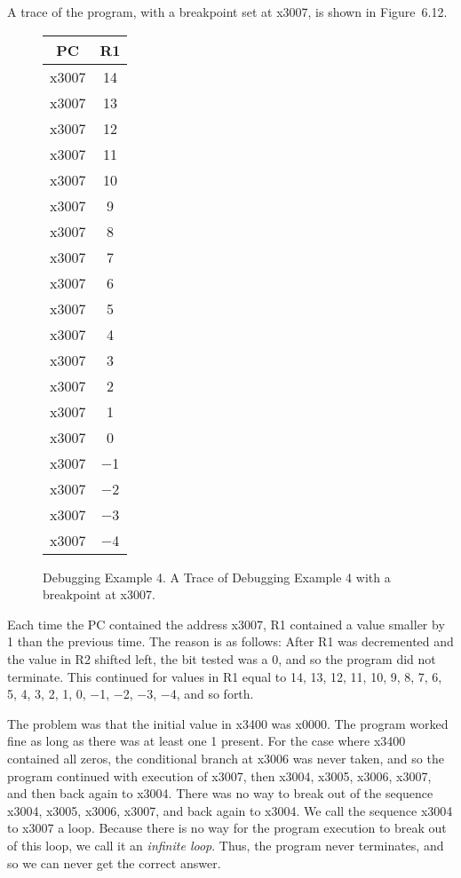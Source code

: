 \documentclass{patt}
\begin{document}
A trace of the program, with a breakpoint set at x3007, is shown in 
Figure~6.12.

\FloatBarrier
\setcounter{figure}{11}
\begin{figure}[b]
\noindent\small
\hspace*{-8pc}\begin{minipage}{36pc}
\begin{center}
\renewcommand{\tabcolsep}{6pt}%
\begin{tabular}{| c | c |}
\hline
PC    & R1 \\
\hline
x3007 & 14 \\
x3007 & 13 \\
x3007 & 12 \\
x3007 & 11 \\
x3007 & 10 \\
x3007 &  9 \\
x3007 &  8 \\
x3007 &  7 \\
x3007 &  6 \\
x3007 &  5 \\
x3007 &  4 \\
x3007 &  3 \\
x3007 &  2 \\
x3007 &  1 \\
x3007 &  0 \\
x3007 & $-$1 \\
x3007 & $-$2 \\
x3007 & $-$3 \\
x3007 & $-$4 \\
\hline
\end{tabular}
\end{center}
\caption{Debugging Example 4. A Trace of Debugging Example 4 with 
a breakpoint at x3007.\label{fig:onlinedebug}}
\end{minipage}
\end{figure}

\FloatBarrier
Each time the PC contained the address x3007, R1 contained a value smaller
by 1 than the previous time.  The reason is as follows: After R1 was
decremented and the value in R2 shifted left, the bit tested was a 0, and so the
program did not terminate.  This continued for values in R1 equal to  14, 13,
12, 11, 10, 9, 8, 7, 6, 5, 4, 3, 2, 1, 0, $-$1, $-$2, $-$3, $-$4,
and so forth.

The problem was that the initial value in x3400 was x0000.
The program worked fine as long as there was at least one 1
present.  For the case where x3400 contained all zeros, the conditional branch
at x3006 was never taken, and so the program continued with execution of x3007,
then x3004, x3005, x3006, x3007, and then back again to x3004.  There was no
way to break out of the sequence x3004, x3005, x3006, x3007, and back again to
x3004.  We call the sequence x3004 to x3007 a loop.  Because there is no way
for the program execution to break out of this loop, we call it an {\em infinite
loop}.  Thus, the program never terminates, and so we can never get
the correct answer.
\end{document}
